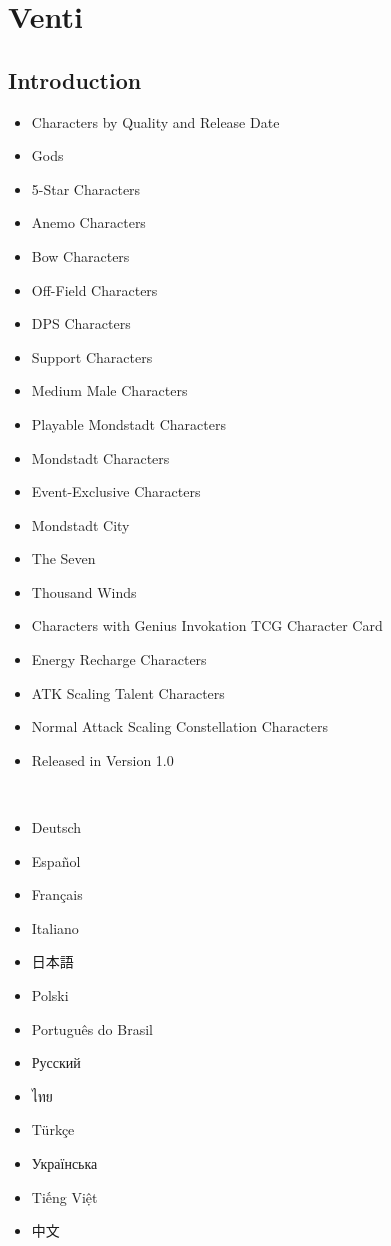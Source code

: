 \documentclass[a4paper,12pt]{article}
\begin{document}
\section*{ Venti}

\subsection*{Introduction}\n\n\begin{itemize}
\item Characters by Quality and Release Date
\item Gods
\item 5-Star Characters
\item Anemo Characters
\item Bow Characters
\item Off-Field Characters
\item DPS Characters
\item Support Characters
\item Medium Male Characters
\item Playable Mondstadt Characters
\item Mondstadt Characters
\item Event-Exclusive Characters
\item Mondstadt City
\item The Seven
\item Thousand Winds
\item Characters with Genius Invokation TCG Character Card
\item Energy Recharge Characters
\item ATK Scaling Talent Characters
\item Normal Attack Scaling Constellation Characters
\item Released in Version 1.0
\end{itemize}\\ \par \vspace{0.5cm}

\begin{itemize}
\item Deutsch
\item Español
\item Français
\item Italiano
\item 日本語
\item Polski
\item Português do Brasil
\item Русский
\item ไทย
\item Türkçe
\item Українська
\item Tiếng Việt
\item 中文
\end{itemize}\\ \par \vspace{0.5cm}
\end{document}
